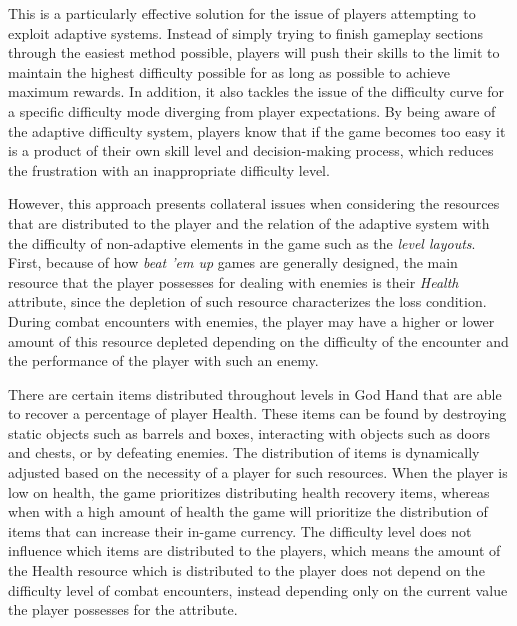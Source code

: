This is a particularly effective solution for the issue of players attempting to exploit adaptive systems. Instead of simply trying to finish gameplay sections through the easiest method possible, players will push their skills to the limit to maintain the highest difficulty possible for as long as possible to achieve maximum rewards. In addition, it also tackles the issue of the difficulty curve for a specific difficulty mode diverging from player expectations. By being aware of the adaptive difficulty system, players know that if the game becomes too easy it is a product of their own skill level and decision-making process, which reduces the frustration with an inappropriate difficulty level.


However, this approach presents collateral issues when considering the resources that are distributed to the player and the relation of the adaptive system with the difficulty of non-adaptive elements in the game such as the \emph{level layouts}. First, because of how \emph{beat 'em up} games are generally designed, the main resource that the player possesses for dealing with enemies is their \emph{Health} attribute, since the depletion of such resource characterizes the loss condition. During combat encounters with enemies, the player may have a higher or lower amount of this resource depleted depending on the difficulty of the encounter and the performance of the player with such an enemy. 

There are certain items distributed throughout levels in God Hand that are able to recover a percentage of player Health. These items can be found by destroying static objects such as barrels and boxes, interacting with objects such as doors and chests, or by defeating enemies. The distribution of items is dynamically adjusted based on the necessity of a player for such resources. When the player is low on health, the game prioritizes distributing health recovery items, whereas when with a high amount of health the game will prioritize the distribution of items that can increase their in-game currency. The difficulty level does not influence which items are distributed to the players, which means the amount of the Health resource which is distributed to the player does not depend on the difficulty level of combat encounters, instead depending only on the current value the player possesses for the attribute. 

